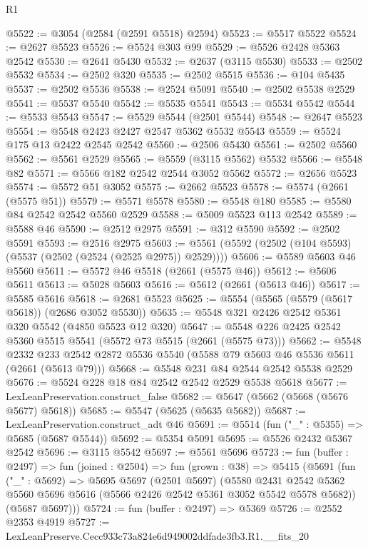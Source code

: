 \begin{lexlean}{R1}
\begin{coremodule}
@5522 := @3054 (@2584 (@2591 @5518) @2594)
@5523 := @5517 @5522
@5524 := @2627 @5523
@5526 := @5524 @303 @99
@5529 := @5526 @2428 @5363 @2542
@5530 := @2641 @5430
@5532 := @2637 (@3115 @5530)
@5533 := @2502 @5532
@5534 := @2502 @320
@5535 := @2502 @5515
@5536 := @104 @5435
@5537 := @2502 @5536
@5538 := @2524 @5091
@5540 := @2502 @5538 @2529
@5541 := @5537 @5540
@5542 := @5535 @5541
@5543 := @5534 @5542
@5544 := @5533 @5543
@5547 := @5529 @5544 (@2501 @5544)
@5548 := @2647 @5523
@5554 := @5548 @2423 @2427 @2547 @5362 @5532 @5543
@5559 := @5524 @175 @13 @2422 @2545 @2542
@5560 := @2506 @5430
@5561 := @2502 @5560
@5562 := @5561 @2529
@5565 := @5559 (@3115 @5562) @5532
@5566 := @5548 @82
@5571 := @5566 @182 @2542 @2544 @3052 @5562
@5572 := @2656 @5523
@5574 := @5572 @51 @3052
@5575 := @2662 @5523
@5578 := @5574 (@2661 (@5575 @51))
@5579 := @5571 @5578
@5580 := @5548 @180
@5585 := @5580 @84 @2542 @2542 @5560 @2529
@5588 := @5009 @5523 @113 @2542
@5589 := @5588 @46
@5590 := @2512 @2975
@5591 := @312 @5590
@5592 := @2502 @5591
@5593 := @2516 @2975
@5603 := @5561 (@5592 (@2502 (@104 @5593) (@5537 (@2502 (@2524 (@2525 @2975)) @2529))))
@5606 := @5589 @5603 @46 @5560
@5611 := @5572 @46 @5518 (@2661 (@5575 @46))
@5612 := @5606 @5611
@5613 := @5028 @5603
@5616 := @5612 (@2661 (@5613 @46))
@5617 := @5585 @5616
@5618 := @2681 @5523
@5625 := @5554 (@5565 (@5579 (@5617 @5618)) (@2686 @3052 @5530))
@5635 := @5548 @321 @2426 @2542 @5361 @320 @5542 (@4850 @5523 @12 @320)
@5647 := @5548 @226 @2425 @2542 @5360 @5515 @5541 (@5572 @73 @5515 (@2661 (@5575 @73)))
@5662 := @5548
    @2332
    @233
    @2542
    @2872
    @5536
    @5540
    (@5588 @79 @5603 @46 @5536 @5611 (@2661 (@5613 @79)))
@5668 := @5548 @231 @84 @2544 @2542 @5538 @2529
@5676 := @5524 @228 @18 @84 @2542 @2542 @2529 @5538 @5618
@5677 := LexLeanPreservation.construct_false
@5682 := @5647 (@5662 (@5668 (@5676 @5677) @5618))
@5685 := @5547 (@5625 (@5635 @5682))
@5687 := LexLeanPreservation.construct_adt @46
@5691 := @5514 (fun ("_" : @5355) => @5685 (@5687 @5544))
@5692 := @5354 @5091
@5695 := @5526 @2432 @5367 @2542
@5696 := @3115 @5542
@5697 := @5561 @5696
@5723 := fun (buffer : @2497) =>
  fun (joined : @2504) =>
  fun (grown : @38) =>
  @5415
    (@5691
      (fun ("_" : @5692) =>
      @5695
        @5697
        (@2501 @5697)
        (@5580
          @2431
          @2542
          @5362
          @5560
          @5696
          @5616
          (@5566 @2426 @2542 @5361 @3052 @5542 @5578 @5682))
        (@5687 @5697)))
@5724 := fun (buffer : @2497) => @5369
@5726 := @2552 @2353 @4919
@5727 := LexLeanPreserve.Cecc933c73a824e6d949002ddfade3fb3.R1.__fits_20

\end{coremodule}
\end{lexlean}
